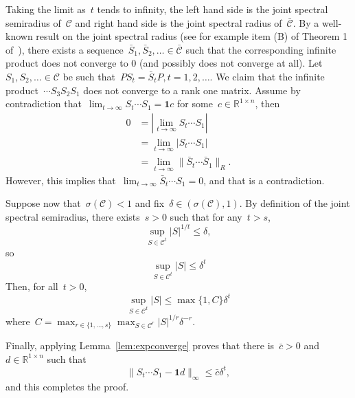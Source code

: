 \documentclass[letterpaper, 10 pt, conference]{ieeeconf}  %
\newcommand{\R}{\mathbb R}
\newcommand{\gensn}[1]{|#1|} %
\newcommand{\restnorm}[1]{\|#1\|_R} %
\newcommand{\semijsr}{\sigma}
\begin{document}
    Taking the limit as~$t$ tends to infinity, the left hand side is the joint spectral semiradius of~$\mathcal{C}$ and right hand side is the joint spectral radius of~$\mathcal{\bar C}$. By a well-known result on the joint spectral radius (see for example item (B) of Theorem 1 of~\cite{Berger1992Semigroups}), there exists a sequence~$\bar S_1, \bar S_2, \dots \in \mathcal{\bar C}$ such that the corresponding infinite product does not converge to 0 (and possibly does not converge at all). Let~$S_1, S_2, \dots \in \mathcal{C}$ be such that~$PS_t = \bar S_tP, t=1,2,\dots$. We claim that the infinite product~$\cdots S_3 S_2 S_1$ does not converge to a rank one matrix. Assume by contradiction that~$\lim_{t \to \infty} S_t \cdots S_1 = \mathbf{1}c$ for some~$c \in \R^{1 \times n}$, then
    \begin{align*}
        0 &= \gensn{\lim_{t \to \infty} S_t \cdots S_1}  \\
          &= \lim_{t \to \infty}\gensn{S_t \cdots S_1} \\
          &= \lim_{t \to \infty}\restnorm{\bar S_t \cdots \bar S_1}.
    \end{align*}
    However, this implies that~$\lim_{t \to \infty} \bar S_t \cdots S_1 = 0$, and that is a contradiction.

    Suppose now that~$\semijsr(\mathcal{C}) < 1$ and fix~$\delta \in (\semijsr(\mathcal{C}),1)$. By definition of the joint spectral semiradius, there exists~$s > 0$ such that for any~$t > s$,
    \begin{equation}
        \sup_{S \in \mathcal{C}^t} \gensn{S}^{1/t} \le \delta,
    \end{equation}
    so
    \begin{equation}
        \sup_{S \in \mathcal{C}^t} \gensn{S} \le \delta^t
    \end{equation}
    Then, for all~$t>0$,
    \begin{equation}\label{eq:expbound}
        \sup_{S \in \mathcal{C}^t} \gensn{S} \le \max\{1, C\} \delta^t
    \end{equation}
    where~$C = \max_{r \in \{1,\dots,s\}}\max_{S \in \mathcal{C}^r} \gensn{S}^{1/r} \delta^{-r}$.

    Finally, applying Lemma~\ref{lem:expconverge} proves that there is~$\bar c > 0$ and~$d \in \R^{1 \times n}$ such that
    \begin{equation}
        \|S_t \cdots S_1 - \mathbf{1}d\|_\infty \le \bar c \delta^t,
    \end{equation}
    and this completes the proof.
    \hspace*{\fill}~\QED
\end{document}

